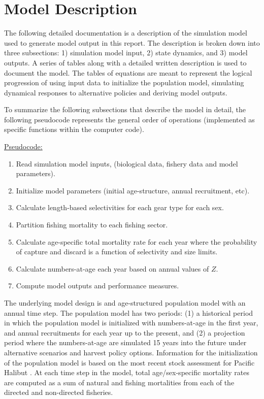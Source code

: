 
\section{Model Description} %
\label{sec:model_description}

The following detailed documentation is a description of the simulation model used to generate model output in this report.  The description is broken down into three subsections: 1) simulation model input, 2) state dynamics, and 3) model outputs.  A series of tables along with a detailed written description is used to document the model.  The tables of equations are meant to represent the logical progression of using input data to initialize the population model, simulating dynamical responses to alternative policies and deriving model outputs.

To summarize the following subsections that describe the model in detail, the following pseudocode represents the general order of operations (implemented as specific functions within the computer code).

\noindent\underline{Pseudocode:}
\begin{enumerate}
	\item Read simulation model inputs, (biological data, fishery data and model parameters).
	\item Initialize model parameters (initial age-structure, annual recruitment, etc).
	\item Calculate length-based selectivities for each gear type for each sex.
	\item Partition fishing mortality to each fishing sector.
	\item Calculate age-specific total mortality rate for each year where the probability of capture and discard is a function of selectivity and size limits.
	\item Calculate numbers-at-age each year based on annual values of $Z$.
	\item Compute model outputs and performance measures.
\end{enumerate}

The underlying model design is and age-structured population model with an annual time step.  The population model has two periods: (1) a historical period in which the population model is initialized with numbers-at-age in the first year, and annual recruitments for each year up to the present, and (2) a projection period where the numbers-at-age are simulated 15 years into the future under alternative scenarios and harvest policy options.  Information for the initialization of the population model is based on the most recent stock assessment for Pacific Halibut \citep{Hare2012Rara}.  At each time step in the model, total age/sex-specific mortality rates are computed as a sum of natural and fishing mortalities from each of the directed and non-directed fisheries.

